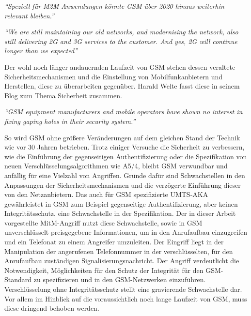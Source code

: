 \textit{"`Speziell für M2M Anwendungen könnte GSM über 2020 hinaus weiterhin relevant bleiben."'} \citep[Tom Tesch]{heise:newsticker-3582914}

\textit{"`We are still maintaining our old networks, and modernising the network, also still delivering 2G and 3G services to the customer. And yes, 2G will continue longer than we expected"'} \citep[Matthias Sauder, Vodafone]{mobileworldlive:long-life-2g}

Der wohl noch länger andauernden Laufzeit von \ac{GSM} stehen dessen veraltete Sicherheitsmechanismen und die Einstellung von Mobilfunkanbietern und Herstellen, diese zu überarbeiten gegenüber. Harald Welte fasst diese in seinem Blog zum Thema Sicherheit zusammen.

\textit{"`GSM equipment manufacturers and mobile operators have shown no interest in fixing gaping holes in their security system."'} \citep[Harald Welte]{laforge:blog-20101112}

So wird \ac{GSM} ohne größere Veränderungen auf dem gleichen Stand der Technik wie vor 30 Jahren betrieben. Trotz einiger Versuche die Sicherheit zu verbessern, wie die Einführung der gegenseitigen Authentifizierung oder die Spezifikation von neuen Verschlüsselungsalgorithmen wie A5/4, bleibt \ac{GSM} verwundbar und anfällig für eine Vielzahl von Angriffen. Gründe dafür sind Schwachstellen in den Anpassungen der Sicherheitsmechanismen und die verzögerte Einführung dieser von den Netzanbietern. Das auch für \ac{GSM} spezifizierte \ac{UMTS}-\ac{AKA} gewährleistet in \ac{GSM} zum Beispiel gegenseitige Authentifizierung, aber keinen Integritätsschutz, eine Schwachstelle in der Spezifikation. Der in dieser Arbeit vorgestellte \ac{MitM}-Angriff nutzt diese Schwachstelle, sowie in \ac{GSM} unverschlüsselt preisgegebene Informationen, um in den Anrufaufbau einzugreifen und ein Telefonat zu einem Angreifer umzuleiten. Der Eingriff liegt in der Manipulation der angerufenen Telefonnummer in der verschlüsselten, für den Anrufaufbau zuständigen Signalisierungsnachricht. Der Angriff verdeutlicht die Notwendigkeit, Möglichkeiten für den Schutz der Integrität für den \ac{GSM}-Standard zu spezifizieren und in den \ac{GSM}-Netzwerken einzuführen. Verschlüsselung ohne Integritätsschutz stellt eine gravierende Schwachstelle dar. Vor allem im Hinblick auf die voraussichtlich noch lange Laufzeit von \ac{GSM}, muss diese dringend behoben werden.